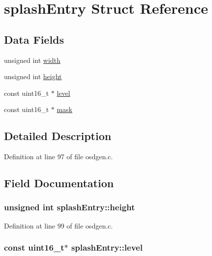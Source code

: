 \hypertarget{structsplash_entry}{\section{splash\-Entry \-Struct \-Reference}
\label{structsplash_entry}
}
\subsection*{\-Data \-Fields}
\begin{DoxyCompactItemize}
\item 
unsigned int \hyperlink{structsplash_entry_abc2b28627fe7b0fc9344188df68bb455}{width}
\item 
unsigned int \hyperlink{structsplash_entry_a270337b9f05acc774a1297f830c956d7}{height}
\item 
const uint16\-\_\-t $\ast$ \hyperlink{structsplash_entry_a6508f6926dabf69e7f04cec57e8f6d21}{level}
\item 
const uint16\-\_\-t $\ast$ \hyperlink{structsplash_entry_a0c3001285740dd3a0351be5565bf13d2}{mask}
\end{DoxyCompactItemize}


\subsection{\-Detailed \-Description}


\-Definition at line 97 of file osdgen.\-c.



\subsection{\-Field \-Documentation}
\hypertarget{structsplash_entry_a270337b9f05acc774a1297f830c956d7}{
\subsubsection[{height}]{\setlength{\rightskip}{0pt plus 5cm}unsigned int {\bf splash\-Entry\-::height}}}\label{structsplash_entry_a270337b9f05acc774a1297f830c956d7}


\-Definition at line 99 of file osdgen.\-c.

\hypertarget{structsplash_entry_a6508f6926dabf69e7f04cec57e8f6d21}{
\subsubsection[{level}]{\setlength{\rightskip}{0pt plus 5cm}const uint16\-\_\-t$\ast$ {\bf splash\-Entry\-::level}}}\label{structsplash_entry_a6508f6926dabf69e7f04cec57e8f6d21}


